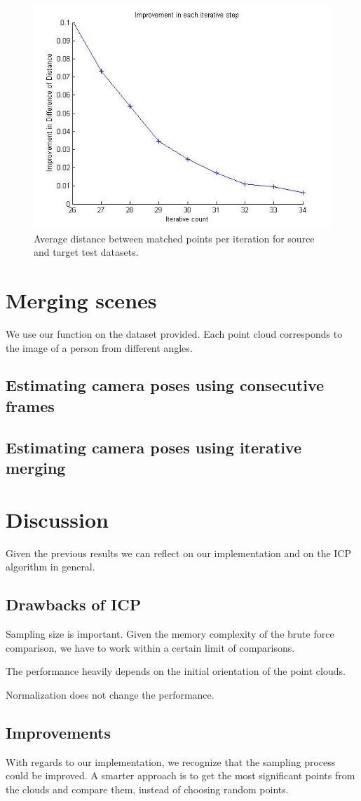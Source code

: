 \documentclass[11pt]{article}
\begin{document}
\begin{figure}[H]
	\centering
	\includegraphics[width=.6\textwidth]{img/test_performance.jpg}
	\caption{Average distance between matched points per iteration for source and target test datasets.}
	\label{fig:test_performance}
\end{figure}


\section{Merging scenes}
We use our function on the dataset provided. Each point cloud corresponds to the image of a person from different angles. 


\subsection{Estimating camera poses using consecutive frames}



\subsection{Estimating camera poses using iterative merging}



\section{Discussion}
\label{reflection}
Given the previous results we can reflect on our implementation and on the ICP algorithm in general.

\subsection{Drawbacks of ICP}
Sampling size is important. Given the memory complexity of the brute force comparison, we have to work within a certain limit of comparisons.

The performance heavily depends on the initial orientation of the point clouds. 

Normalization does not change the performance.
 
 
\subsection{Improvements}
With regards to our implementation, we recognize that the sampling process could be improved. A smarter approach is to get the most significant points from the clouds and compare them, instead of choosing random points. 
\end{document}
